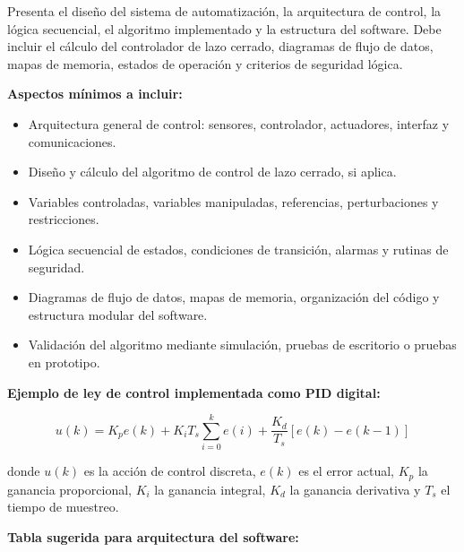\documentclass[12pt,letterpaper]{report}
\begin{document}
\begin{instrucciones}
Presenta el diseño del sistema de automatización, la arquitectura de control, la lógica secuencial, el algoritmo implementado y la estructura del software. Debe incluir el cálculo del controlador de lazo cerrado, diagramas de flujo de datos, mapas de memoria, estados de operación y criterios de seguridad lógica.

\vspace{2mm}
\noindent \textbf{Aspectos mínimos a incluir:}
\begin{itemize}
  \item Arquitectura general de control: sensores, controlador, actuadores, interfaz y comunicaciones.
  \item Diseño y cálculo del algoritmo de control de lazo cerrado, si aplica.
  \item Variables controladas, variables manipuladas, referencias, perturbaciones y restricciones.
  \item Lógica secuencial de estados, condiciones de transición, alarmas y rutinas de seguridad.
  \item Diagramas de flujo de datos, mapas de memoria, organización del código y estructura modular del software.
  \item Validación del algoritmo mediante simulación, pruebas de escritorio o pruebas en prototipo.
\end{itemize}

\vspace{2mm}
\noindent \textbf{Ejemplo de ley de control implementada como PID digital:}

\[
u(k) = K_p e(k) + K_i T_s \sum_{i=0}^{k} e(i) + \frac{K_d}{T_s}\left[e(k) - e(k-1)\right]
\]

\noindent donde $u(k)$ es la acción de control discreta, $e(k)$ es el error actual, $K_p$ la ganancia proporcional, $K_i$ la ganancia integral, $K_d$ la ganancia derivativa y $T_s$ el tiempo de muestreo.

\vspace{2mm}
\noindent \textbf{Tabla sugerida para arquitectura del software:}


\end{instrucciones}
\end{document}

